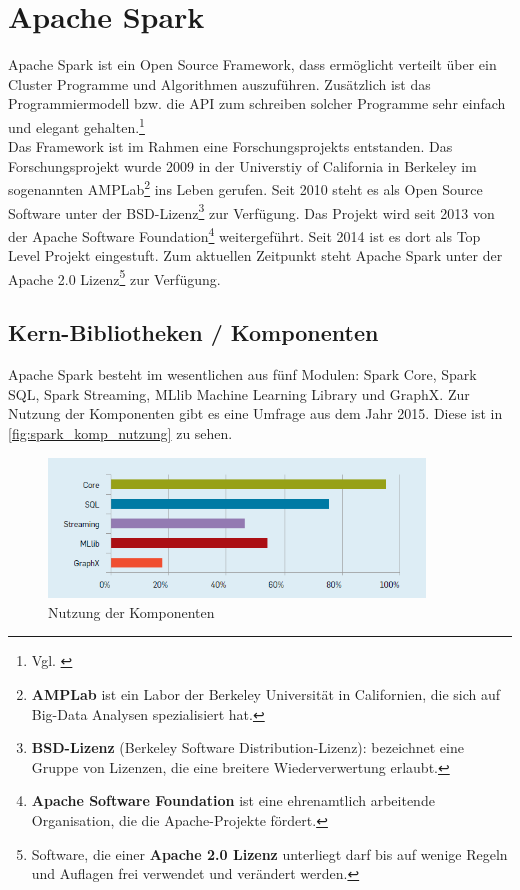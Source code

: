 \newpage
\chapter{Apache Spark} 

Apache Spark ist ein Open Source Framework, dass ermöglicht verteilt über ein Cluster Programme und Algorithmen auszuführen. Zusätzlich ist das Programmiermodell bzw. die API zum schreiben solcher Programme sehr einfach und elegant gehalten.\footnote{Vgl. \cite{AAWS15}} \\

\noindent
Das Framework ist im Rahmen eine Forschungsprojekts entstanden. Das Forschungsprojekt wurde 2009 in der Universtiy of California in Berkeley im sogenannten AMPLab\footnote{\textbf{AMPLab} ist ein Labor der Berkeley Universität in Californien, die sich auf Big-Data Analysen spezialisiert hat. } ins Leben gerufen. Seit 2010 steht es als Open Source Software unter der BSD-Lizenz\footnote{\textbf{BSD-Lizenz} (Berkeley Software Distribution-Lizenz): bezeichnet eine Gruppe von Lizenzen, die eine breitere Wiederverwertung erlaubt.} zur Verfügung. Das Projekt wird seit 2013 von der Apache Software Foundation\footnote{\textbf{Apache Software Foundation} ist eine ehrenamtlich arbeitende Organisation, die die Apache-Projekte fördert.} weitergeführt. Seit 2014 ist es dort als Top Level Projekt eingestuft. Zum aktuellen Zeitpunkt steht Apache Spark unter der Apache 2.0 Lizenz\footnote{Software, die einer \textbf{Apache 2.0 Lizenz} unterliegt darf bis auf wenige Regeln und Auflagen frei verwendet und verändert werden.} zur Verfügung. \\



\section{Kern-Bibliotheken / Komponenten}

Apache Spark besteht im wesentlichen aus fünf Modulen: Spark Core, Spark SQL, Spark Streaming, MLlib Machine Learning Library und GraphX. Zur Nutzung der Komponenten gibt es eine Umfrage aus dem Jahr 2015. Diese ist in \autoref{fig:spark_komp_nutzung} zu sehen. \\

\begin{figure}[h]
  \centering
  \includegraphics[width=100mm]{./bilder/spark_komponenten_nutzung.png}
  \caption{Nutzung der Komponenten \cite{ZXW+16}}\label{fig:spark_komp_nutzung}
\end{figure}


